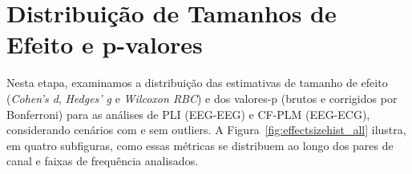 \section{Distribuição de Tamanhos de Efeito e p-valores}
\label{sec:effect_size_distribution}

Nesta etapa, examinamos a distribuição das estimativas de tamanho de efeito (\emph{Cohen's d}, \emph{Hedges' g} e \emph{Wilcoxon RBC}) e dos valores-p (brutos e corrigidos por Bonferroni) para as análises de PLI (EEG-EEG) e CF-PLM (EEG-ECG), considerando cenários com e sem outliers. A Figura~\ref{fig:effectsizehist_all} ilustra, em quatro subfiguras, como essas métricas se distribuem ao longo dos pares de canal e faixas de frequência analisados.

\begin{figure}[htb]
    \centering
    \quad
    \\
\end{figure}
